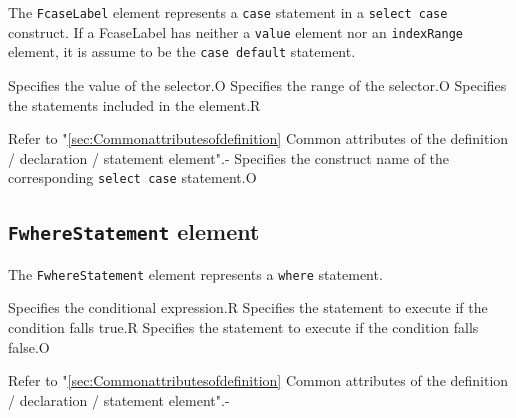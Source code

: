 The {\tt FcaseLabel} element represents a {\tt case} statement in a {\tt select case} construct.
If a FcaseLabel has neither a {\tt value} element nor an {\tt indexRange} element, it is assume to be the {\tt case default} statement.


\begin{XcodeMLChildElements}
{Specifies the value of the selector.}{O}
{Specifies the range of the selector.}{O}
{Specifies the statements included in the element.}{R}
\end{XcodeMLChildElements}

\begin{XcodeMLAttributes}
{Refer to "\ref{sec:Commonattributesofdefinition} Common attributes of the definition / declaration / statement element".}{-}
{Specifies the construct name of the corresponding {\tt select case} statement.}{O}
\end{XcodeMLAttributes}


\subsection{ {\tt FwhereStatement} element}

The {\tt FwhereStatement} element represents a {\tt where} statement.


\begin{XcodeMLChildElements}
{Specifies the conditional expression.}{R}
{Specifies the statement to execute if the condition falls true.}{R}
{Specifies the statement to execute if the condition falls false.}{O}
\end{XcodeMLChildElements}

\begin{XcodeMLAttributes}
{Refer to "\ref{sec:Commonattributesofdefinition} Common attributes of the definition / declaration / statement element".}{-}
\end{XcodeMLAttributes}


